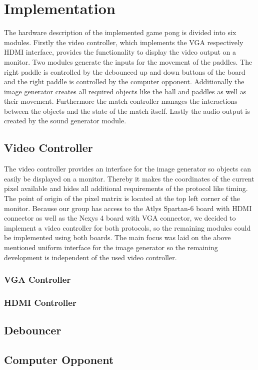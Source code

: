 \newpage
\section{Implementation}
The hardware description of the implemented game pong is divided into six modules. Firstly the video controller, which implements the VGA respectively HDMI interface, provides the functionality to display the video output on a monitor. Two modules generate the inputs for the movement of the paddles. The right paddle is controlled by the debounced up and down buttons of the board and the right paddle is controlled by the computer opponent. Additionally the image generator creates all required objects like the ball and paddles as well as their movement. Furthermore the match controller manages the interactions between the objects and the state of the match itself. Lastly the audio output is created by the sound generator module.
	\subsection{Video Controller}
    The video controller provides an interface for the image generator so objects can easily be displayed on a monitor. Thereby it makes the coordinates of the current pixel available and hides all additional requirements of the protocol like timing. The point of origin of the pixel matrix is located at the top left corner of the monitor. Because our group has access to the Atlys Spartan-6 board with HDMI connector as well as the Nexys 4 board with VGA connector, we decided to implement a video controller for both protocols, so the remaining modules could be implemented using both boards. The main focus was laid on the above mentioned uniform interface for the image generator so the remaining development is independent of the used video controller.
        \subsubsection{VGA Controller}
        \subsubsection{HDMI Controller}
    \subsection{Debouncer}
    \subsection{Computer Opponent}

